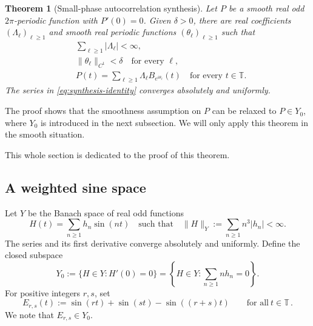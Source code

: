 \documentclass[10pt,a4paper]{amsart}
\newtheorem{theorem}{Theorem}[section]
\newcommand{\T}{\mathbb T}
\begin{document}
\begin{theorem}[Small-phase autocorrelation synthesis]\label{thm:synthesis}
Let $P$ be a smooth real odd $2\pi$-periodic function with $P'(0)=0$.  Given $\delta>0$, there are real coefficients $(\Lambda_\ell)_{\ell\geq1}$ and smooth real periodic functions $(\theta_\ell)_{\ell\geq1}$ such that
\begin{align}
 &\sum_{\ell\geq1}|\Lambda_\ell|<\infty,\label{eq:synthesis-l1}\\
 &\|\theta_\ell\|_{C^1}<\delta
 \quad\text{for every }\ell,\label{eq:synthesis-small}\\
 &P(t)=\sum_{\ell\geq1}\Lambda_\ell
 B_{e^{i\theta_\ell}}(t)
 \quad\text{for every }t\in\T.\label{eq:synthesis-identity}
\end{align}
The series in \eqref{eq:synthesis-identity} converges absolutely and uniformly.
\end{theorem}


The proof shows that the smoothness assumption on $P$ can be relaxed to $P\in Y_0$, where $Y_0$ is introduced in the next subsection. We will only apply this theorem in the smooth situation.

This whole section is dedicated to the proof of this theorem.


\subsection{A weighted sine space}

Let $Y$ be the Banach space of real odd functions
\begin{equation}\label{eq:Y-definition}
 H(t)=\sum_{n\geq1}h_n\sin(nt)
 \quad\text{such that}\quad
 \|H\|_Y:=\sum_{n\geq1}n^3|h_n|<\infty.
\end{equation}
The series and its first derivative converge absolutely and uniformly.  Define the closed subspace
\begin{equation}\label{eq:Y0-definition}
 Y_0:=\{H\in Y:H'(0)=0\}
 =\left\{H\in Y:\sum_{n\geq1}nh_n=0
 \right\}.
\end{equation}
For positive integers $r,s$, set
\begin{equation}\label{eq:Ers}
 E_{r,s}(t):=\sin(rt)+\sin(st)-\sin((r+s)t)
 \qquad\text{for all}\ t\in\T \,.
\end{equation}
We note that $E_{r,s}\in Y_0$.
\end{document}
